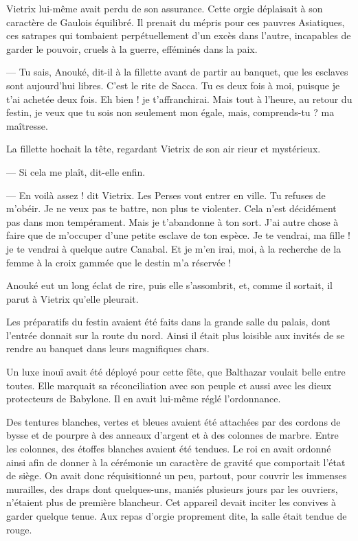 \documentclass[a4paper, 11pt, oneside, polutonikogreek, french]{article}
\begin{document}
Vietrix lui-même avait perdu de son assurance. Cette orgie déplaisait à son caractère de Gaulois équilibré. Il prenait du mépris pour ces pauvres Asiatiques, ces satrapes qui tombaient perpétuellement d'un excès dans l'autre, incapables de garder le pouvoir, cruels à la guerre, efféminés dans la paix.

--- Tu sais, Anouké, dit-il à la fillette avant de partir au banquet, que les esclaves sont aujourd'hui libres. C'est le rite de Sacca. Tu es deux fois à moi, puisque je t'ai achetée deux fois. Eh bien ! je t'affranchirai. Mais tout à l'heure, au retour du festin, je veux que tu sois non seulement mon égale, mais, comprends-tu ? ma maîtresse.

La fillette hochait la tête, regardant Vietrix de son air rieur et mystérieux.

--- Si cela me plaît, dit-elle enfin.

--- En voilà assez ! dit Vietrix. Les Perses vont entrer en ville. Tu refuses de m'obéir. Je ne veux pas te battre, non plus te violenter. Cela n'est décidément pas dans mon tempérament. Mais je t'abandonne à ton sort. J'ai autre chose à faire que de m'occuper d'une petite esclave de ton espèce. Je te vendrai, ma fille ! je te vendrai à quelque autre Canabal. Et je m'en irai, moi, à la recherche de la femme à la croix gammée que le destin m'a réservée !

Anouké eut un long éclat de rire, puis elle s'assombrit, et, comme il sortait, il parut à Vietrix qu'elle pleurait.

\bigskip
\centerline{\EightStarTaper}
\centerline{\EightStarTaper\EightStarTaper}
\bigskip

Les préparatifs du festin avaient été faits dans la grande salle du palais, dont l'entrée donnait sur la route du nord. Ainsi il était plus loisible aux invités de se rendre au banquet dans leurs magnifiques chars.

Un luxe inouï avait été déployé pour cette fête, que Balthazar voulait belle entre toutes. Elle marquait sa réconciliation avec son peuple et aussi avec les dieux protecteurs de Babylone. Il en avait lui-même réglé l'ordonnance.

Des tentures blanches, vertes et bleues avaient été attachées par des cordons de bysse et de pourpre à des anneaux d'argent et à des colonnes de marbre. Entre les colonnes, des étoffes blanches avaient été tendues. Le roi en avait ordonné ainsi afin de donner à la cérémonie un caractère de gravité que comportait l'état de siège. On avait donc réquisitionné un peu, partout, pour couvrir les immenses murailles, des draps dont quelques-uns, maniés plusieurs jours par les ouvriers, n'étaient plus de première blancheur. Cet appareil devait inciter les convives à garder quelque tenue. Aux repas d'orgie proprement dite, la salle était tendue de rouge.
\end{document}
